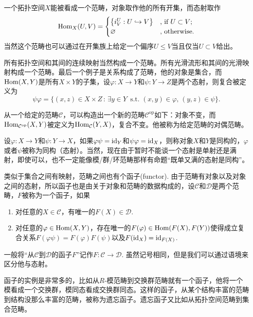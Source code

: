 一个拓扑空间$X$能被看成一个范畴，对象取作他的所有开集，而态射取作
\[
	\operatorname{Hom}_{X}(U,V)=\begin{cases}
	\bigl\{i^U_V:U\hookrightarrow V\bigr\}&\text{, if }U\subset V\text{;}\\
	\varnothing&\text{, otherwise}.
	\end{cases}
\]
当然这个范畴也可以通过在开集族上给定一个偏序$U\leq V$当且仅当$U\subset V$给出。

所有拓扑空间和其间的连续映射当然构成一个范畴。所有光滑流形和其间的光滑映射构成一个范畴。最后一个例子是关系构成了范畴，他的对象是集合，而$\operatorname{Hom}(X,Y)$是所有$X\times Y$的子集，设$\varphi:X\to Y$和$\psi:Y\to Z$是两个态射，则复合被定义为
\[
	\psi\varphi=\{(x,z)\in X\times Z\,:\,\exists y\in Y\,\text{ s.t. } (x,y)\in\varphi,\, (y,z)\in \psi\}.
\]

\para 从一个给定的范畴$\mathcal{C}$，可以构造出一个新的范畴$\mathcal{C}^{\mathrm{op}}$如下：对象不变，而$\operatorname{Hom}_{\mathcal{C}^{\mathrm{op}}}(X,Y)$被定义为$\operatorname{Hom}_{\mathcal{C}}(Y,X)$，复合不变。他被称为给定范畴的对偶范畴。

\para 设$\varphi:X\to Y$和$\psi:Y\to X$，如果$\varphi\psi=\operatorname{id}_Y$和$\psi\varphi=\operatorname{id}_X$，则称对象$X$和$Y$是同构的，$\varphi$或者$\psi$被称为同构（态射）。当然，现在由于暂时不能谈一个态射是单射还是满射，即使可以，也不一定能像模/群/环范畴那样有命题“既单又满的态射是同构”。

\para 类似于集合之间有映射，范畴之间也有个函子(functor). 由于范畴有对象以及对象之间的态射，所以函子也是由关于对象和范畴的数据构成的，设$\mathcal{C}$和$\mathcal{D}$是两个范畴，$F$被称为一个函子，如果
\begin{enumerate}

\item 对任意的$X\in \mathcal{C}$，有唯一的$F(X)\in \mathcal{D}$.

\item 对任意的$\varphi\in \operatorname{Hom}(X,Y)$，存在唯一的$F(\varphi)\in  \operatorname{Hom}(F(X),F(Y))$使得成立复合关系$F(\varphi\psi)=F(\varphi)F(\psi)$以及$F(\operatorname{id}_X)=\operatorname{id}_{F(X)}$.

\end{enumerate}

一般将“从$\mathcal{C}$到$\mathcal{D}$的函子$F$”记作$F:\mathcal{C}\to \mathcal{D}$. 虽然记号相同，但是我们可以通过语境来区分他与态射。

函子的实例是非常多的，比如从$R$-模范畴到交换群范畴就有一个函子，他将一个模看成一个交换群，模同态看成交换群同态。这样的函子，从某个结构丰富的范畴到结构没那么丰富的范畴，被称为遗忘函子。遗忘函子又比如从拓扑空间范畴到集合范畴。

